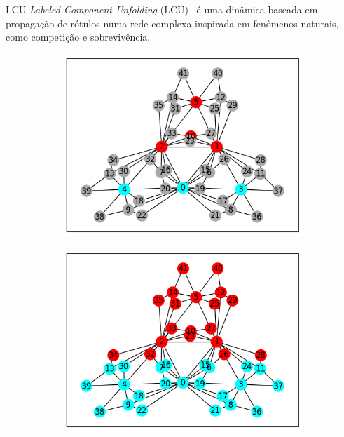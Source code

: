 \documentclass{templatebeamerufc/libs/ufc_format}
\begin{document}
\begin{frame}{LCU}
  \textit{Labeled Component Unfolding} (LCU)~\cite{VerriNetworkUnfoldingMap2018} é uma dinâmica baseada em
propagação de rótulos numa rede complexa inspirada em fenômenos
naturais, como competição e sobrevivência.

\begin{figure}[!h]
\centering
    \caption{\label{fig:lcu-execution}
      Rede complexa para execução da dinâmica LCU.\@
      Anotação parcial em~() e resultado final em~().
    }

    \begin{subfigure}[b]{0.45\textwidth}
    \centering
    \includegraphics[scale=0.4]{figuras/lcu-partial}
    \caption{\label{fig:lcu-partial}}
    \end{subfigure}
\quad
    \begin{subfigure}[b]{0.45\textwidth}
    \centering
    \includegraphics[scale=0.4]{figuras/lcu-done}
    \caption{\label{fig:lcu-done}}
    \end{subfigure}
    \source{\fonteautor}
\quad
\end{figure}
\end{frame}
\end{document}
